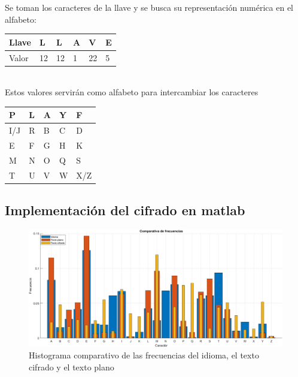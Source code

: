 \documentclass[10pt]{article}
\begin{document}
    Se toman los caracteres de la llave y se busca su representación numérica en el alfabeto:
    \begin{table}[h!]
      \begin{adjustbox}{width=0.3\columnwidth,center}
        \begin{tabular}{|l|l|l|l|l|l|}
      \hline
      Llave & L  & L  & A & V  & E \\ \hline
      Valor & 12 & 12 & 1 & 22 & 5 \\ \hline
    \end{tabular}
  \end{adjustbox}
\end{table}
\\
Estos valores servirán como alfabeto para intercambiar los caracteres
\begin{center}
  \begin{table}[ht]
    \begin{adjustbox}{width=0.4\columnwidth,center}
    \begin{tabular}{|l|l|l|l|l|}
    \hline
    P & L & A & Y & F \\ \hline
    I/J & R & B & C & D \\ \hline
    E & F & G & H & K \\ \hline
    M & N & O & Q & S \\ \hline
    T & U & V & W & X/Z \\ \hline
    \end{tabular}
  \end{adjustbox}
    \end{table}
\end{center}




\newpage


\subsection{Implementación del cifrado en matlab}      

\newpage

\begin{figure}[!ht]
  \centering
  \includegraphics[width=1\textwidth]{histogramaCiphedPlayFair.png}
  \caption{Histograma comparativo de las frecuencias del idioma, el texto cifrado y el texto plano}
  \label{fig_sim}
\end{figure}
\end{document}
